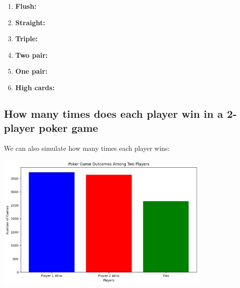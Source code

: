 \documentclass{article}
\begin{document}
\begin{enumerate}
\[\begin{aligned}
{\begin{array}{l}
            5 \\
            1
            \end{array}\right)\left(\begin{array}{l}
            4 \\
            1
            \end{array}\right)\left[\left(\begin{array}{l}
            4 \\
            1
            \end{array}\right)^4-3\right]} \\
            & {[1277 \times 10 \times[6 \times 62+24 \times 63+6 \times 64]]} \\
            & +\left[\left(
            13 \\
            3
            \end{array}\right)\left(
            4 \\
            2
            \end{array}\right)^3\left(
            40 \\
            1
            \end{array}\right)\right] \\
            &
            \end{aligned}
    \]
    \item \textbf{Flush:}
    \item \textbf{Straight:}
    \item \textbf{Triple:}
    \item \textbf{Two pair:}
    \item \textbf{One pair:}
    \item \textbf{High cards:}
\end{enumerate}



\subsection*{How many times does each player win in a 2-player poker game}

We can also simulate how many times each player wins:

\begin{center}
    \includegraphics[width = 0.8\textwidth]{images/win_rate_2_player.png}
\end{center}
\end{document}
